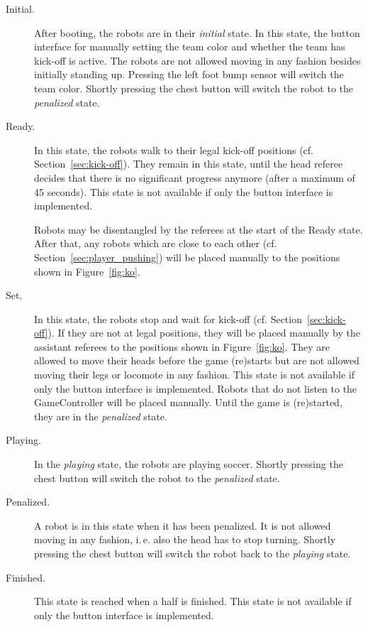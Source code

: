 \documentclass[12pt]{article}
\newcommand{\ie}{\mbox{i.\,e.}\xspace}
\newcommand{\cf}{\mbox{cf.}\xspace}
\newcommand{\KickOffAutoTime}{45 seconds\xspace}
\begin{document}
\begin{description}

\item[Initial.] After booting, the robots are in their \emph{initial} state. In this state, the button interface for manually setting the team color and whether the team has kick-off is active. The robots are not allowed moving in any fashion besides initially standing up. Pressing the left foot bump sensor will switch the team color. Shortly pressing the chest button will switch the robot to the \emph{penalized} state.

\item[Ready.] In this state, the robots walk to their legal kick-off positions (\cf Section~\ref{sec:kick-off}). They remain in this state, until the head referee decides that there is no significant progress anymore (after a maximum of \KickOffAutoTime). This state is not available if only the button interface is implemented.

Robots may be disentangled by the referees at the start of the Ready state. After that, any robots which are close to each other (\cf Section~\ref{sec:player_pushing}) will be placed manually to the positions shown in Figure~\ref{fig:ko}.

\item[Set.] In this state, the robots stop and wait for kick-off (\cf Section~\ref{sec:kick-off}). If they are not at legal positions, they will be placed manually by the assistant referees to the positions shown in Figure~\ref{fig:ko}. They are allowed to move their heads before the game (re)starts but are not allowed moving their legs or locomote in any fashion. This state is not available if only the button interface is implemented. Robots that do not listen to the GameController will be placed manually. Until the game is (re)started, they are in the \emph{penalized} state.

\item[Playing.] In the \emph{playing} state, the robots are playing soccer. Shortly pressing the chest button will switch the robot to the \emph{penalized} state.

\item[Penalized.] A robot is in this state when it has been penalized. It is not allowed moving in any fashion, \ie also the head has to stop turning. Shortly pressing the chest button will switch the robot back to the \emph{playing} state.

\item[Finished.] This state is reached when a half is finished. This state is not available if only the button interface is implemented.

\end{description}
\end{document}
